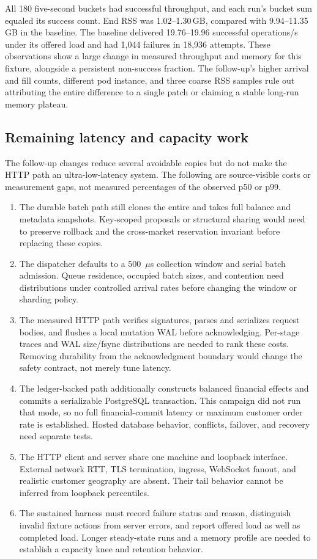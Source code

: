 \documentclass[envcountsame,runningheads,notitlepage]{llncs}
\newcommand{\pathref}[1]{\texttt{\detokenize{#1}}}
\begin{document}
All 180 five-second buckets had successful throughput, and each run's bucket sum equaled its success count. End RSS was 1.02--1.30\,GB, compared with 9.94--11.35\,GB in the baseline. The baseline delivered 19.76--19.96 successful operations/s under its offered load and had 1,044 failures in 18,936 attempts. These observations show a large change in measured throughput and memory for this fixture, alongside a persistent non-success fraction. The follow-up's higher arrival and fill counts, different pod instance, and three coarse RSS samples rule out attributing the entire difference to a single patch or claiming a stable long-run memory plateau.\cite{benchdata,rebenchdata}

\subsection{Remaining latency and capacity work}
The follow-up changes reduce several avoidable copies but do not make the HTTP path an ultra-low-latency system. The following are source-visible costs or measurement gaps, not measured percentages of the observed p50 or p99.\cite{source,rebenchdata}
\begin{enumerate}
\item The durable batch path still clones the entire \pathref{UserState} and takes full balance and metadata snapshots. Key-scoped proposals or structural sharing would need to preserve rollback and the cross-market reservation invariant before replacing these copies.
\item The dispatcher defaults to a 500~$\mu$s collection window and serial batch admission. Queue residence, occupied batch sizes, and contention need distributions under controlled arrival rates before changing the window or sharding policy.
\item The measured HTTP path verifies signatures, parses and serializes request bodies, and flushes a local mutation WAL before acknowledging. Per-stage traces and WAL size/fsync distributions are needed to rank these costs. Removing durability from the acknowledgment boundary would change the safety contract, not merely tune latency.
\item The ledger-backed path additionally constructs balanced financial effects and commits a serializable PostgreSQL transaction. This campaign did not run that mode, so no full financial-commit latency or maximum customer order rate is established. Hosted database behavior, conflicts, failover, and recovery need separate tests.
\item The HTTP client and server share one machine and loopback interface. External network RTT, TLS termination, ingress, WebSocket fanout, and realistic customer geography are absent. Their tail behavior cannot be inferred from loopback percentiles.
\item The sustained harness must record failure status and reason, distinguish invalid fixture actions from server errors, and report offered load as well as completed load. Longer steady-state runs and a memory profile are needed to establish a capacity knee and retention behavior.
\end{enumerate}
\end{document}
